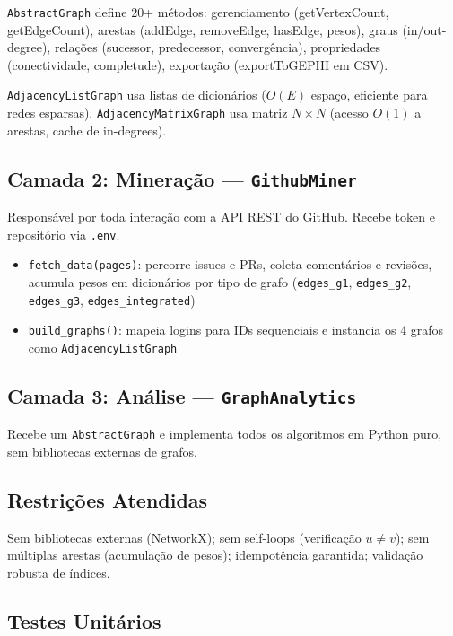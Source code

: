 \documentclass[12pt]{article}
\begin{document}
\texttt{AbstractGraph} define 20+ métodos: gerenciamento (getVertexCount, getEdgeCount), arestas (addEdge, removeEdge, hasEdge, pesos), graus (in/out-degree), relações (sucessor, predecessor, convergência), propriedades (conectividade, completude), exportação (exportToGEPHI em CSV).

\texttt{AdjacencyListGraph} usa listas de dicionários ($O(E)$ espaço, eficiente para redes esparsas). \texttt{AdjacencyMatrixGraph} usa matriz $N \times N$ (acesso $O(1)$ a arestas, cache de in-degrees).

\subsection{Camada 2: Mineração --- \texttt{GithubMiner}}

Responsável por toda interação com a API REST do GitHub. Recebe token e repositório via \texttt{.env}.

\begin{itemize}
  \item \texttt{fetch\_data(pages)}: percorre issues e PRs, coleta comentários e revisões, acumula pesos em dicionários por tipo de grafo (\texttt{edges\_g1}, \texttt{edges\_g2}, \texttt{edges\_g3}, \texttt{edges\_integrated})
  \item \texttt{build\_graphs()}: mapeia logins para IDs sequenciais e instancia os 4 grafos como \texttt{AdjacencyListGraph}
\end{itemize}

\subsection{Camada 3: Análise --- \texttt{GraphAnalytics}}

Recebe um \texttt{AbstractGraph} e implementa todos os algoritmos em Python puro, sem bibliotecas externas de grafos.

\subsection{Restrições Atendidas}

Sem bibliotecas externas (NetworkX); sem self-loops (verificação $u \neq v$); sem múltiplas arestas (acumulação de pesos); idempotência garantida; validação robusta de índices.

\subsection{Testes Unitários}
\end{document}

